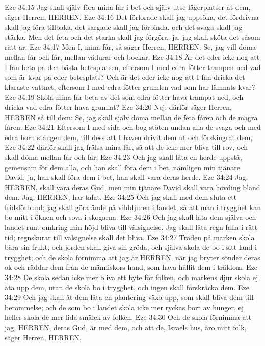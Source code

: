 Eze 34:15  Jag skall själv föra mina får i bet och själv utse lägerplatser åt dem, säger Herren, HERREN.
Eze 34:16  Det förlorade skall jag uppsöka, det fördrivna skall jag föra tillbaka, det sargade skall jag förbinda, och det svaga skall jag stärka. Men det feta och det starka skall jag förgöra; ja, jag skall sköta det såsom rätt är.
Eze 34:17  Men I, mina får, så säger Herren, HERREN: Se, jag vill döma mellan får och får, mellan vädurar och bockar.
Eze 34:18  Är det eder icke nog att I fån beta på den bästa betesplatsen, eftersom I med edra fötter trampen ned vad som är kvar på eder betesplats? Och är det eder icke nog att I fån dricka det klaraste vattnet, eftersom I med edra fötter grumlen vad som har lämnats kvar?
Eze 34:19  Skola mina får beta av det som edra fötter hava trampat ned, och dricka vad edra fötter hava grumlat?
Eze 34:20  Nej; därför säger Herren, HERREN så till dem: Se, jag skall själv döma mellan de feta fåren och de magra fåren.
Eze 34:21  Eftersom I med sida och bog stöten undan alla de svaga och med edra horn stången dem, till dess att I haven drivit dem ut och förskingrat dem,
Eze 34:22  därför skall jag frälsa mina får, så att de icke mer bliva till rov, och skall döma mellan får och får.
Eze 34:23  Och jag skall låta en herde uppstå, gemensam för dem alla, och han skall föra dem i bet, nämligen min tjänare David; ja, han skall föra dem i bet, han skall vara deras herde.
Eze 34:24  Jag, HERREN, skall vara deras Gud, men min tjänare David skall vara hövding bland dem. Jag, HERREN, har talat.
Eze 34:25  Och jag skall med dem sluta ett fridsförbund; jag skall göra ände på vilddjuren i landet, så att man i trygghet kan bo mitt i öknen och sova i skogarna.
Eze 34:26  Och jag skall låta dem själva och landet runt omkring min höjd bliva till välsignelse. Jag skall låta regn falla i rätt tid; regnskurar till välsignelse skall det bliva.
Eze 34:27  Träden på marken skola bära sin frukt, och jorden skall giva sin gröda, och själva skola de bo i sitt land i trygghet; och de skola förnimma att jag är HERREN, när jag bryter sönder deras ok och räddar dem från de människors hand, som hava hållit dem i träldom.
Eze 34:28  De skola sedan icke mer bliva ett byte för folken, och markens djur skola ej äta upp dem, utan de skola bo i trygghet, och ingen skall förskräcka dem.
Eze 34:29  Och jag skall åt dem låta en plantering växa upp, som skall bliva dem till berömmelse; och de som bo i landet skola icke mer ryckas bort av hunger, ej heller skola de mer lida smälek av folken.
Eze 34:30  Och de skola förnimma att jag, HERREN, deras Gud, är med dem, och att de, Israels hus, äro mitt folk, säger Herren, HERREN.
